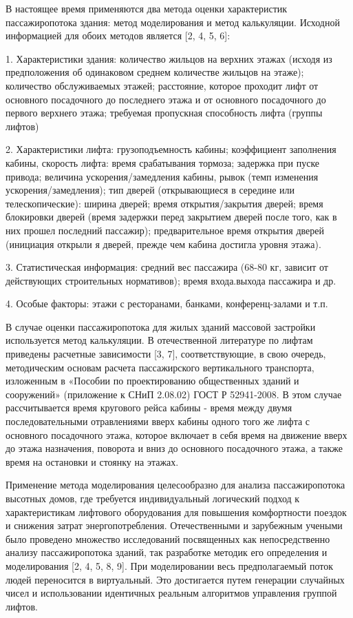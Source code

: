 	В настоящее время применяются два метода оценки характеристик пассажиропотока здания: метод моделирования и метод калькуляции.
		Исходной информацией для обоих методов является [2, 4, 5, 6]:

	1. Характеристики здания: количество жильцов на верхних этажах (исходя из предположения об одинаковом среднем
		количестве жильцов на этаже); количество обслуживаемых этажей; расстояние, которое проходит лифт от основного посадочного
		до последнего этажа и от основного посадочного до первого верхнего этажа; требуемая пропускная способность лифта (группы лифтов)
		
	2. Характеристики лифта: грузоподъемность кабины; коэффициент заполнения кабины, скорость лифта: время срабатывания тормоза;
		задержка при пуске привода; величина ускорения/замедления кабины, рывок (темп изменения ускорения/замедления);
		тип дверей (открывающиеся в середине или телескопические): ширина дверей; время открытия/закрытия дверей;
		время блокировки дверей (время задержки перед закрытием дверей после того, как в них прошел последний пассажир);
		предварительное время открытия дверей (инициация открыли я дверей, прежде чем кабина достигла уровня этажа).

	3. Статистическая информация: средний вес пассажира (68-80 кг, зависит от действующих строительных нормативов);
		время входа.выхода пассажира и др.

	4. Особые факторы: этажи с ресторанами, банками, конференц-залами и т.п.
	 
	В случае оценки пассажиропотока для жилых зданий массовой застройки используется метод калькуляции.
		В отечественной литературе по лифтам приведены расчетные зависимости [3, 7], соответствующие, в свою очередь, методическим
		основам расчета пассажирского вертикального транспорта, изложенным в «Пособии по проектированию общественных зданий и сооружений»
		(приложение к СНиП 2.08.02) ГОСТ Р 52941-2008. В этом случае рассчитывается время кругового рейса кабины -
		время между двумя последовательными отравлениями вверх кабины одного того же лифта с основного посадочного этажа,
		которое включает в себя время на движение вверх до этажа назначения, поворота и вниз до основного посадочного этажа,
		а также время на остановки и стоянку на этажах.

	Применение метода моделирования целесообразно для анализа пассажиропотока высотных домов, где требуется индивидуальный
		логический подход к характеристикам лифтового оборудования для повышения комфортности поездок и снижения затрат энергопотребления.
		Отечественными и зарубежным учеными было проведено множество исследований посвященных как непосредственно анализу пассажиропотока зданий,
		так разработке методик его определения и моделирования [2, 4, 5, 8, 9]. При моделировании весь предполагаемый поток людей
		переносится в виртуальный. Это достигается путем генерации случайных чисел и использовании идентичных реальным алгоритмов
		управления группой лифтов.
		
